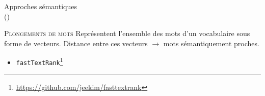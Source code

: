 \begin{frame}{Approches sémantiques\\ {\small(\hypersetup{citecolor=yellow}\cite{garaudsemantiques})}}
\justifying
\begin{block}{\textsc{Plongements de mots}}
\justifying
Représentent l’ensemble des mots d’un vocabulaire sous forme de vecteurs. Distance entre ces vecteurs $\rightarrow$ mots sémantiquement proches.
\end{block}
\begin{itemize}
\item \small{\texttt{fastTextRank}\footnote{\url{https://github.com/jeekim/fasttextrank}}}
\end{itemize}

\medskip


\end{frame}
